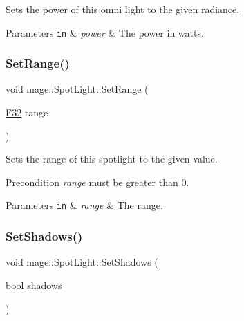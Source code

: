Sets the power of this omni light to the given radiance.


\begin{DoxyParams}[1]{Parameters}
\mbox{\tt in}  & {\em power} & The power in watts. \\
\hline
\end{DoxyParams}
\hypertarget{classmage_1_1_spot_light_a96f8d35fe374f9d06c49d68a3ac1f213}{}\label{classmage_1_1_spot_light_a96f8d35fe374f9d06c49d68a3ac1f213} 
\subsubsection{\texorpdfstring{Set\+Range()}{SetRange()}}
{\footnotesize\ttfamily void mage\+::\+Spot\+Light\+::\+Set\+Range (\begin{DoxyParamCaption}\item[{\hyperlink{namespacemage_aa97e833b45f06d60a0a9c4fc22ae02c0}{F32}}]{range }\end{DoxyParamCaption})\hspace{0.3cm}{\ttfamily [noexcept]}}

Sets the range of this spotlight to the given value.

\begin{DoxyPrecond}{Precondition}
{\itshape range} must be greater than 0. 
\end{DoxyPrecond}

\begin{DoxyParams}[1]{Parameters}
\mbox{\tt in}  & {\em range} & The range. \\
\hline
\end{DoxyParams}
\hypertarget{classmage_1_1_spot_light_a290ce2f0ce8814cac75f05322fc01cd5}{}\label{classmage_1_1_spot_light_a290ce2f0ce8814cac75f05322fc01cd5} 
\subsubsection{\texorpdfstring{Set\+Shadows()}{SetShadows()}}
{\footnotesize\ttfamily void mage\+::\+Spot\+Light\+::\+Set\+Shadows (\begin{DoxyParamCaption}\item[{bool}]{shadows }\end{DoxyParamCaption})\hspace{0.3cm}{\ttfamily [noexcept]}}

